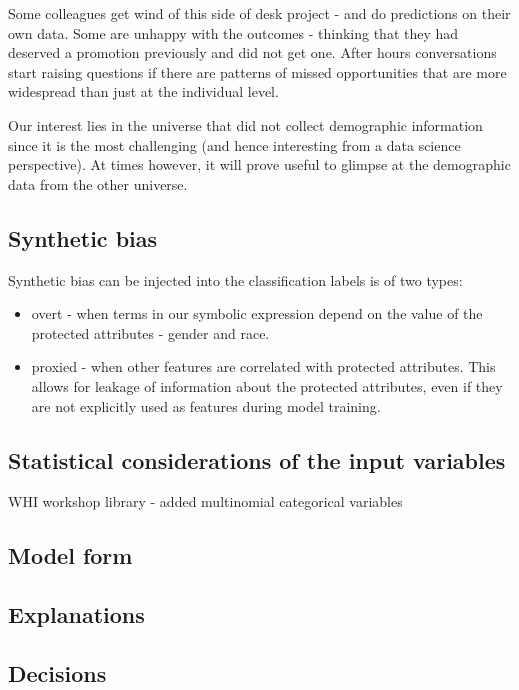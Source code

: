\documentclass[manuscript,screen,review]{acmart}
\begin{document}
Some colleagues get wind of this side of desk project - and do predictions on their own data.  Some are unhappy with the outcomes - thinking that they had deserved a promotion previously and did not get one.   After hours conversations start raising questions if there are patterns of missed opportunities that are more widespread than just at the individual level.

Our interest lies in the universe that did not collect demographic information since it is the most challenging (and hence interesting from a data science perspective).  At times however, it will prove useful to glimpse at the demographic data from the other universe.


\subsection{Synthetic bias}
Synthetic bias can be injected into the classification labels is of two types:
\begin{itemize}
    \item overt - when terms in our symbolic expression depend on the value of the protected attributes - gender and race.
    \item proxied - when other features are correlated with protected attributes.  This allows for leakage of information about the protected attributes, even if they are not explicitly used as features during model training.
\end{itemize}


\subsection{Statistical considerations of the input variables}
WHI workshop library - added multinomial categorical variables



\subsection{Model form}


\subsection{Explanations}

\subsection{Decisions}
\end{document}
